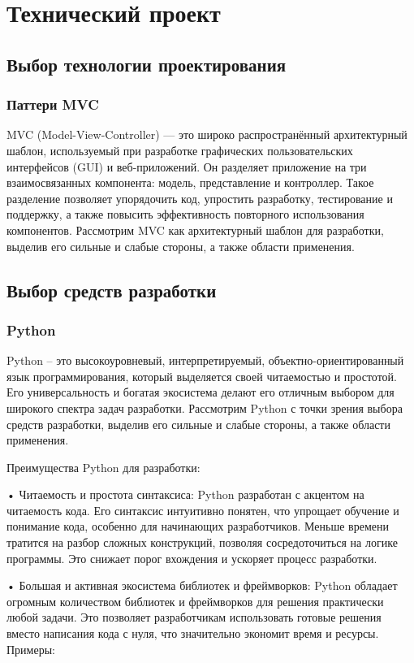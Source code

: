 \section{Технический проект}
\subsection{Выбор технологии проектирования}
\subsubsection{Паттери MVC}

MVC (Model-View-Controller) — это широко распространённый архитектурный шаблон, используемый при разработке графических пользовательских интерфейсов (GUI) и веб-приложений. Он разделяет приложение на три взаимосвязанных компонента: модель, представление и контроллер. Такое разделение позволяет упорядочить код, упростить разработку, тестирование и поддержку, а также повысить эффективность повторного использования компонентов. Рассмотрим MVC как архитектурный шаблон для разработки, выделив его сильные и слабые стороны, а также области применения.

\subsection{Выбор средств разработки}
\subsubsection{Python}

Python – это высокоуровневый, интерпретируемый, объектно-ориентированный язык программирования, который выделяется своей читаемостью и простотой. Его универсальность и богатая экосистема делают его отличным выбором для широкого спектра задач разработки. Рассмотрим Python с точки зрения выбора средств разработки, выделив его сильные и слабые стороны, а также области применения.

Преимущества Python для разработки:

•	Читаемость и простота синтаксиса: Python разработан с акцентом на читаемость кода. Его синтаксис интуитивно понятен, что упрощает обучение и понимание кода, особенно для начинающих разработчиков. Меньше времени тратится на разбор сложных конструкций, позволяя сосредоточиться на логике программы. Это снижает порог вхождения и ускоряет процесс разработки.

•	Большая и активная экосистема библиотек и фреймворков: Python обладает огромным количеством библиотек и фреймворков для решения практически любой задачи. Это позволяет разработчикам использовать готовые решения вместо написания кода с нуля, что значительно экономит время и ресурсы. Примеры:

